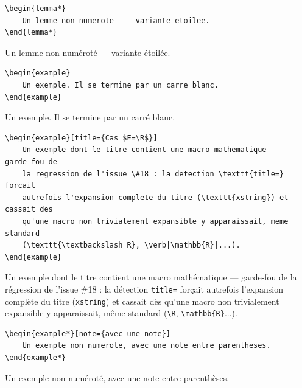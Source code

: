 \begin{lstlisting}
\begin{lemma*}
    Un lemme non numerote --- variante etoilee.
\end{lemma*}
\end{lstlisting}
\begin{lemma*}
    Un lemme non numéroté --- variante étoilée.
\end{lemma*}

\begin{lstlisting}
\begin{example}
    Un exemple. Il se termine par un carre blanc.
\end{example}
\end{lstlisting}
\begin{example}
    Un exemple. Il se termine par un carré blanc.
\end{example}

\begin{lstlisting}
\begin{example}[title={Cas $E=\R$}]
    Un exemple dont le titre contient une macro mathematique --- garde-fou de
    la regression de l'issue \#18 : la detection \texttt{title=} forcait
    autrefois l'expansion complete du titre (\texttt{xstring}) et cassait des
    qu'une macro non trivialement expansible y apparaissait, meme standard
    (\texttt{\textbackslash R}, \verb|\mathbb{R}|...).
\end{example}
\end{lstlisting}
\begin{example}[title={Cas $E=\R$}]
    Un exemple dont le titre contient une macro mathématique --- garde-fou de
    la régression de l'issue \#18 : la détection \texttt{title=} forçait
    autrefois l'expansion complète du titre (\texttt{xstring}) et cassait dès
    qu'une macro non trivialement expansible y apparaissait, même standard
    (\texttt{\textbackslash R}, \verb|\mathbb{R}|...).
\end{example}

\begin{lstlisting}
\begin{example*}[note={avec une note}]
    Un exemple non numerote, avec une note entre parentheses.
\end{example*}
\end{lstlisting}
\begin{example*}[note={avec une note}]
    Un exemple non numéroté, avec une note entre parenthèses.
\end{example*}

